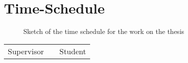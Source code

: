 \documentclass[12pt]{scrartcl}
\begin{document}
\section{Time-Schedule}%
\label{sec:schedule}

\begin{figure}[!ht]
	\centering
	\caption{Sketch of the time schedule for the work on the thesis}\label{fig:schedule}
\end{figure}

\newpage
{%
\renewcommand{\bibfont}{\normalfont\small}
\setlength{\biblabelsep}{5pt}
\setlength{\bibitemsep}{0.5\baselineskip plus 0.5\baselineskip} %
\setcounter{biburllcpenalty}{9000}
\setcounter{biburlucpenalty}{9999}
\printbibliography%
}

\vspace{6cm}

\begin{center}
	\begin{tabular}{l p{} r}
		\cline{1-1} \cline{3-3}
		\begin{minipage}[t]{0.4\textwidth}
			\centering
			\vspace{0cm}Supervisor
		\end{minipage}
		&
		\begin{minipage}[t]{0.2\textwidth}
		\end{minipage}
		&
		\begin{minipage}[t]{0.4\textwidth}
			\centering
			\vspace{0cm}Student
		\end{minipage}
	\end{tabular}
\end{center}
\end{document}
